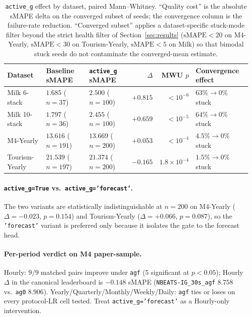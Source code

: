 \documentclass[11pt,a4paper]{article}
\begin{document}
\begin{table}[h]
\centering
\small
\caption{\texttt{active\_g} effect by dataset, paired Mann--Whitney. ``Quality cost'' is the absolute sMAPE delta on the converged subset of seeds; the convergence column is the failure-rate reduction. ``Converged subset'' applies a dataset-specific stuck-mode filter beyond the strict health filter of Section~\ref{sec:results} ($\mathrm{sMAPE}<20$ on M4-Yearly, $\mathrm{sMAPE}<30$ on Tourism-Yearly, $\mathrm{sMAPE}<5$ on Milk) so that bimodal stuck seeds do not contaminate the converged-mean estimate.}
\label{tab:active_g_ablation}
\begin{tabular}{@{}lllrrl@{}}
\toprule
Dataset & Baseline sMAPE & \texttt{active\_g} sMAPE & $\Delta$ & MWU $p$ & Convergence effect \\
\midrule
Milk 6-stack    & $1.685$ ($n{=}37$)   & $2.500$ ($n{=}100$)  & $+0.815$ & $<10^{-6}$  & $63\% \to 0\%$ stuck \\
Milk 10-stack   & $1.797$ ($n{=}36$)   & $2.455$ ($n{=}100$)  & $+0.659$ & $<10^{-5}$  & $64\% \to 0\%$ stuck \\
M4-Yearly       & $13.616$ ($n{=}191$) & $13.669$ ($n{=}200$) & $+0.053$ & $<10^{-4}$  & $4.5\% \to 0\%$ stuck \\
Tourism-Yearly  & $21.539$ ($n{=}197$) & $21.374$ ($n{=}200$) & $-0.165$ & $1.8\times 10^{-4}$ & $1.5\% \to 0\%$ stuck \\
\bottomrule
\end{tabular}
\end{table}

\paragraph{\texttt{active\_g=True} vs.\ \texttt{active\_g='forecast'}.} The two variants are statistically indistinguishable at $n=200$ on M4-Yearly ($\Delta = -0.023$, $p=0.154$) and Tourism-Yearly ($\Delta = +0.066$, $p=0.087$), so the \texttt{'forecast'} variant is preferred only because it isolates the gate to the forecast head.

\paragraph{Per-period verdict on M4 paper-sample.} Hourly: $9/9$ matched pairs improve under \texttt{agf} (5 significant at $p<0.05$); Hourly $\Delta$ in the canonical leaderboard is $-0.148$ sMAPE (\texttt{NBEATS-IG\_30s\_agf} $8.758$ vs.\ \texttt{ag0} $8.906$). Yearly/Quarterly/Monthly/Weekly/Daily: \texttt{agf} ties or loses on every protocol-LR cell tested. Treat \texttt{active\_g='forecast'} as a Hourly-only intervention.
\end{document}
